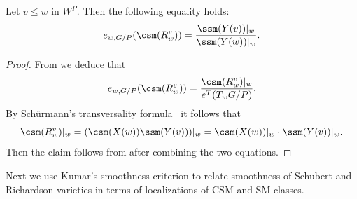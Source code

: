 \begin{prop}\label{prop:eqmult} Let $v \le w$ in $W^P$. Then the following equality holds:
	\[e_{w,G/P} (\csm(R_w^{v}))= \frac{\ssm(Y(v))|_w}{\ssm(Y(w))|_w} \/. \]
\end{prop}
\begin{proof} From  we deduce that 
	\[ e_{w,G/P} (\csm(R_w^{v}))= \frac{\csm(R_w^v)|_w}{e^T (T_w G/P)} \/. \]
	By Sch{\"u}rmann's transversality formula~\cite{schurmann:transversality,AMSS:shadows}
	it follows that 
	\[\csm(R_w^v)|_w = (\csm(X(w)) \ssm(Y(v)))|_w 
	= \csm(X(w))|_w \cdot \ssm(Y(v))|_w \/. \]
	Then the claim follows from  after combining the two equations. 
\end{proof}

Next we use {Kumar's smoothness criterion} 
to relate smoothness of Schubert and Richardson varieties in terms of localizations
of CSM and SM classes.

